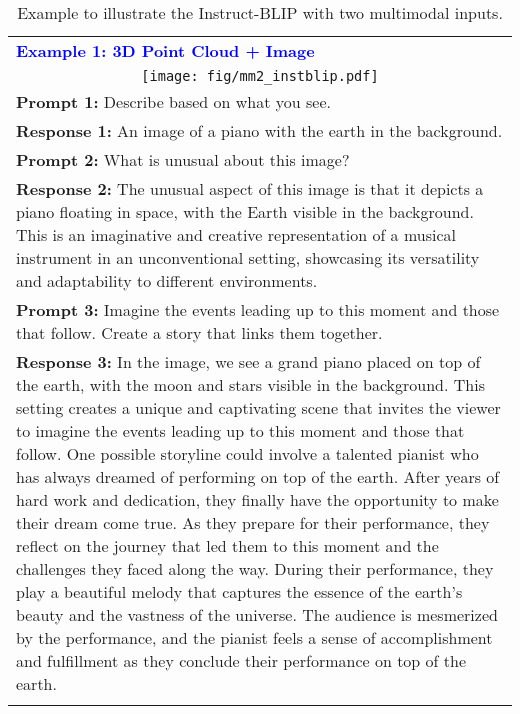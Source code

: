 \documentclass{article}
\newcommand{\methodname}{{\scshape Vit-lens}\xspace}
\begin{document}
\begin{table*}[h!]\centering
\begin{minipage}{1.0\columnwidth}\vspace{0mm}
\centering
\caption{Example to illustrate the Instruct-BLIP with two multimodal inputs.}
    \label{tab:example_mm2_insblip}
\begin{tcolorbox}[colback=white,colframe=blue!75!black,title={\bf InstructBLIP w/ \methodname, Two Multimodal Inputs.}]
    \centering
      \footnotesize
\begin{tabular}{p{} }
 \textcolor{blue}{ {\bf Example 1: 3D Point Cloud + Image} } \\
 \multicolumn{1}{c}{\texttt{[image: fig/mm2\_instblip.pdf]}} \\
{\bf Prompt 1:} Describe based on what you see.  \\
{\bf Response 1:} An image of a piano with the earth in the background.  \\ 
{\bf Prompt 2:} What is unusual about this image?  \\
{\bf Response 2:} The unusual aspect of this image is that it depicts a piano floating in space, with the Earth visible in the background. This is an imaginative and creative representation of a musical instrument in an unconventional setting, showcasing its versatility and adaptability to different environments. \\
{\bf Prompt 3:} Imagine the events leading up to this moment and those that follow. Create a story that links them together.  \\
{\bf Response 3:} In the image, we see a grand piano placed on top of the earth, with the moon and stars visible in the background. This setting creates a unique and captivating scene that invites the viewer to imagine the events leading up to this moment and those that follow. One possible storyline could involve a talented pianist who has always dreamed of performing on top of the earth. After years of hard work and dedication, they finally have the opportunity to make their dream come true. As they prepare for their performance, they reflect on the journey that led them to this moment and the challenges they faced along the way. During their performance, they play a beautiful melody that captures the essence of the earth's beauty and the vastness of the universe. The audience is mesmerized by the performance, and the pianist feels a sense of accomplishment and fulfillment as they conclude their performance on top of the earth.  \\ \\

\end{tabular}
\end{tcolorbox}
\end{minipage}
\end{table*}
\end{document}
